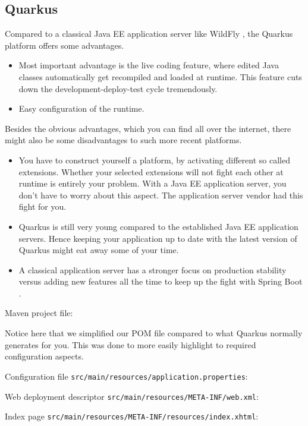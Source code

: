 \subsection{Quarkus}

Compared to a classical Java EE application server like WildFly \cite{WildFly}, the Quarkus \cite{quarkus} platform offers some advantages.
\begin{itemize}
	\item Most important advantage is the live coding feature, where edited Java classes automatically get recompiled and loaded at runtime.
	This feature cuts down the development-deploy-test cycle tremendously.
	\item Easy configuration of the runtime.
\end{itemize}
Besides the obvious advantages, which you can find all over the internet, there might also be some disadvantages to such more recent platforms.
\begin{itemize}
	\item You have to construct yourself a platform, by activating different so called extensions.
	Whether your selected extensions will not fight each other at runtime is entirely your problem.
	With a Java EE application server, you don't have to worry about this aspect.
	The application server vendor had this fight for you.
	\item Quarkus is still very young compared to the established Java EE application servers.
	Hence keeping your application up to date with the latest version of Quarkus might eat away some of your time.
	\item A classical application server has a stronger focus on production stability versus adding new features all the time to keep up the fight with Spring Boot \cite{spring}.
\end{itemize}

Maven project file:

Notice here that we simplified our POM file compared to what Quarkus normally generates for you.
This was done to more easily highlight to required configuration aspects.

Configuration file \texttt{src/main/resources/application.properties}:


Web deployment descriptor \texttt{src/main/resources/META-INF/web.xml}:


Index page \texttt{src/main/resources/META-INF/resources/index.xhtml}:


